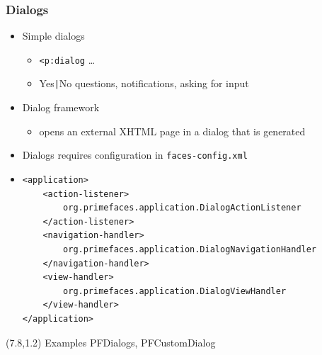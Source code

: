 \documentclass[10pt,xcolor=pdflatex]{beamer}
\begin{document}
\begin{frame}[containsverbatim]\frametitle{Dialogs}
  \begin{itemize}
    \item Simple dialogs
	  \begin{itemize}
		\item \verb;<p:dialog; \ldots
		\item Yes\verb;|;No questions, notifications, asking for input
	  \end{itemize}
    \item Dialog framework
	  \begin{itemize}
		\item opens an external XHTML page in a dialog that is generated
	  \end{itemize}
    \item Dialogs requires configuration in \texttt{faces-config.xml}
    \item[] \begin{footnotesize}
    \begin{verbatim}
<application>
    <action-listener>
        org.primefaces.application.DialogActionListener
    </action-listener>
    <navigation-handler>
        org.primefaces.application.DialogNavigationHandler
    </navigation-handler>
    <view-handler>
        org.primefaces.application.DialogViewHandler
    </view-handler>
</application>    
    \end{verbatim}
    \end{footnotesize}
  \end{itemize}
\begin{textblock}{10}(7.8,1.2)
    {\footnotesize Examples PFDialogs, PFCustomDialog}
\end{textblock}
\end{frame}
\end{document}
